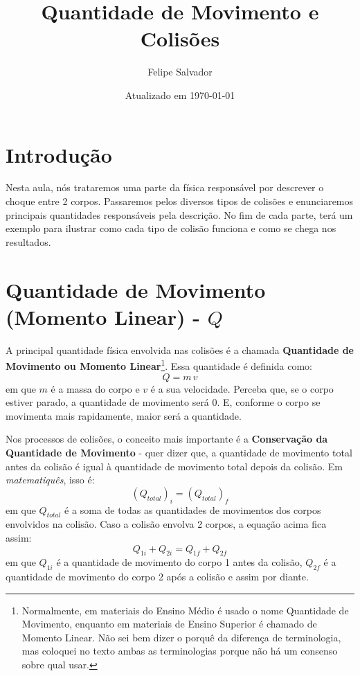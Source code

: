\documentclass[12pt]{extarticle}
\title{Quantidade de Movimento e Colisões}
\author{Felipe Salvador}
\date{Atualizado em \today}
\newcommand{\<}{\langle}
\renewcommand{\>}{\rangle}
\theoremstyle{definition}
\begin{document}
\maketitle

\section{Introdução}
Nesta aula, nós trataremos uma parte da física responsável por descrever o choque entre 2 corpos. Passaremos pelos diversos tipos de colisões e enunciaremos principais quantidades responsáveis pela descrição. No fim de cada parte, terá um exemplo para ilustrar como cada tipo de colisão funciona e como se chega nos resultados.

\section{Quantidade de Movimento (Momento Linear) - $Q$}

A principal quantidade física envolvida nas colisões é a chamada \textbf{Quantidade de Movimento ou Momento Linear}\footnote{Normalmente, em materiais do Ensino Médio é usado o nome Quantidade de Movimento, enquanto em materiais de Ensino Superior é chamado de Momento Linear. Não sei bem dizer o porquê da diferença de terminologia, mas coloquei no texto ambas as terminologias porque não há um consenso sobre qual usar.}. Essa quantidade é definida como:
\begin{equation}
    Q = m\,v
\end{equation}
\noindent em que $m$ é a massa do corpo e $v$ é a sua velocidade. Perceba que, se o corpo estiver parado, a quantidade de movimento será 0. E, conforme o corpo se movimenta mais rapidamente, maior será a quantidade.

Nos processos de colisões, o conceito mais importante é a \textbf{Conservação da Quantidade de Movimento} - quer dizer que, a quantidade de movimento total antes da colisão é igual à quantidade de movimento total depois da colisão. Em \textit{matematiquês}, isso é:
\begin{equation}
    (Q_{total})_i = (Q_{total})_f
\end{equation}
\noindent em que $Q_{total}$ é a soma de todas as quantidades de movimentos dos corpos envolvidos na colisão.
Caso a colisão envolva 2 corpos, a equação acima fica assim:
\begin{equation}
    Q_{1i} + Q_{2i} = Q_{1f} + Q_{2f}
\end{equation}
\noindent em que $Q_{1i}$ é a quantidade de movimento do corpo 1 antes da colisão, $Q_{2f}$ é a quantidade de movimento do corpo 2 após a colisão e assim por diante.
\end{document}
